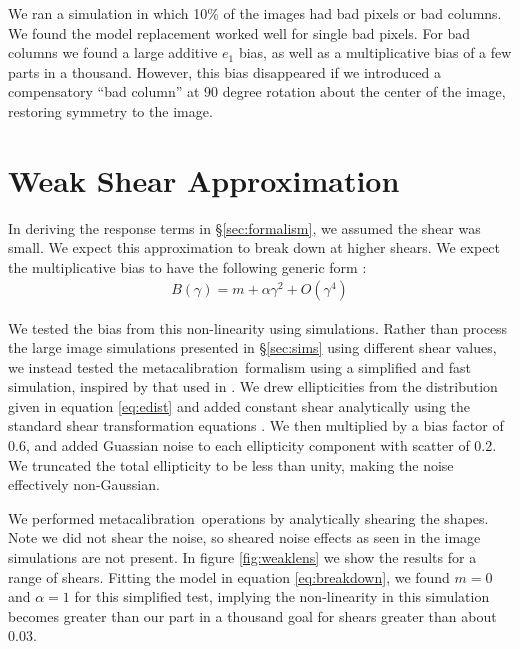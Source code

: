 \documentclass[iop]{emulateapj}
\newcommand{\mcal}{metacalibration}
\begin{document}
We ran a simulation in which 10\% of the images had bad pixels or bad columns.
We found the model replacement worked well for single bad pixels. For bad
columns we found a large additive $e_1$ bias, as well as a multiplicative bias
of a few parts in a thousand.  However, this bias disappeared if we introduced
a compensatory ``bad column'' at 90 degree rotation about the center of the
image, restoring symmetry to the image. 

\section{Weak Shear Approximation}

In deriving the response terms in \S \ref{sec:formalism}, we assumed the shear
was small. We expect this approximation to break down at higher shears.  We
expect the multiplicative bias to have the following generic form \citep{bfd2016}:
\begin{align} \label{eq:breakdown}
	B(\gamma) = m + \alpha \gamma^2 + O(\gamma^4)
\end{align}


We tested the bias from this non-linearity using simulations.
Rather than process the large image simulations presented in \S \ref{sec:sims} using
different shear values, we instead tested the \mcal\ formalism using a
simplified and fast simulation, inspired by that used in \citep{ba14}.  We drew
ellipticities from the distribution given in equation \ref{eq:edist} and added
constant shear analytically using the standard shear transformation equations
\citep{SeitzSchneider97}.  We then multiplied by a bias factor of 0.6, and
added Guassian noise to each ellipticity component with scatter of 0.2. We
truncated the total ellipticity to be less than unity, making the noise
effectively non-Gaussian.

We performed \mcal\ operations by analytically shearing the shapes.  Note we
did not shear the noise, so sheared noise effects as seen in the image
simulations are not present.  In figure \ref{fig:weaklens} we show the results
for a range of shears.  Fitting the model in equation \ref{eq:breakdown}, we
found $m=0$ and $\alpha=1$ for this simplified test, implying  the
non-linearity in this simulation becomes greater than our part in a thousand
goal for shears greater than about 0.03.
\end{document}
